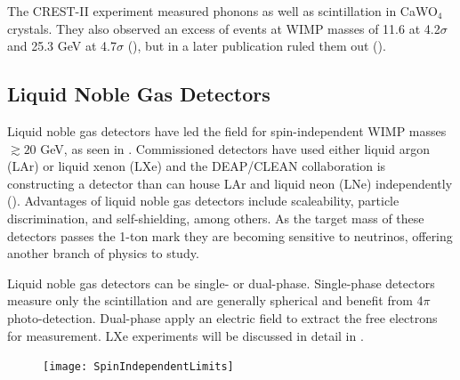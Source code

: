 The CREST-II experiment measured phonons as well as scintillation in CaWO$_{4}$ crystals.  They also observed an excess of
events at WIMP masses of 11.6 at 4.2$\sigma$ and 25.3 GeV at 4.7$\sigma$ (), but in a later publication
ruled them out ().


\subsection{Liquid Noble Gas Detectors} \label{subsec:noble_gas}
Liquid noble gas detectors have led the field for spin-independent WIMP masses $\gtrsim 20$ GeV, as seen in
.  Commissioned detectors have
used either liquid argon (LAr) or liquid xenon (LXe) and the DEAP/CLEAN collaboration is constructing a detector than can house
LAr and liquid neon (LNe) independently ().  Advantages of liquid noble gas detectors
include scaleability, particle discrimination, and self-shielding, among others.  As the target mass of these detectors passes
the 1-ton mark they are becoming sensitive to neutrinos, offering another branch of physics to study.

Liquid noble gas detectors can be single- or dual-phase.  Single-phase detectors measure only the scintillation and are generally
spherical and benefit from 4$\pi$ photo-detection.  Dual-phase apply an electric field to extract the free electrons for
measurement.  LXe experiments will be discussed in detail in .

\begin{figure}
\centering
\texttt{[image: SpinIndependentLimits]}
\label{fig:si_limits}
\end{figure}


